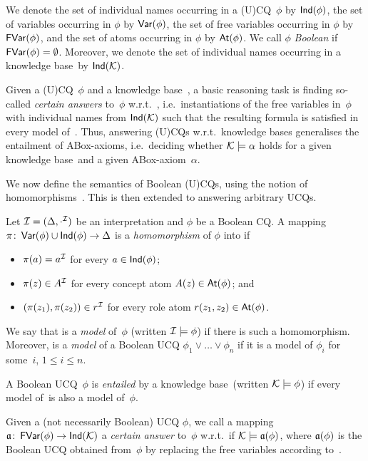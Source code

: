 \noindent
We denote the set of individual names occurring in a (U)CQ~$\phi$ by
$\mathsf{Ind}(\phi)$, the set of variables occurring in $\phi$ by $\operatorname{\mathsf{Var}}(\phi)$, the set
of free variables occurring in $\phi$ by $\operatorname{\mathsf{FVar}}(\phi)$, and the set of atoms
occurring in $\phi$ by $\operatorname{\mathsf{At}}(\phi)$.
%
We call $\phi$ \emph{Boolean} if $\operatorname{\mathsf{FVar}}(\phi)=\emptyset$.
%
Moreover, we denote the set of individual names occurring in a knowledge
base~\Kmc by $\mathsf{Ind}(\mathcal{K})$.

Given a (U)CQ~$\phi$ and a knowledge base~\Kmc, a basic reasoning task is
finding so-called \emph{certain answers} to~$\phi$ w.r.t.~\Kmc,
i.e.~instantiations of the free variables in~$\phi$ with individual names from
$\mathsf{Ind}(\mathcal{K})$ such that the resulting formula is satisfied in every model
of~\Kmc.  Thus, answering (U)CQs w.r.t.\ knowledge bases generalises the
entailment of ABox-axioms, i.e.~deciding whether $\mathcal{K}\models\alpha$ holds for a
given knowledge base~\Kmc and a given ABox-axiom~$\alpha$.

We now define the semantics of Boolean (U)CQs, using the notion of
homomorphisms~\cite{ChMe-STOC77}.  This is then extended to answering arbitrary
UCQs.

\begin{definition}
    Let $\mathcal{I}=(\Delta,\cdot^\mathcal{I})$ be an interpretation and $\phi$ be a Boolean
    CQ\@. A mapping $\pi\colon\operatorname{\mathsf{Var}}(\phi)\cup\mathsf{Ind}(\phi)\to\Delta$ is a
    \emph{homomorphism} of $\phi$ into \Imc if
    \begin{itemize}
        \item $\pi(a)=a^\mathcal{I}$ for every $a\in\mathsf{Ind}(\phi)$;
        \item $\pi(z)\in A^\mathcal{I}$ for every concept atom $A(z)\in\operatorname{\mathsf{At}}(\phi)$;
            and
        \item $(\pi(z_1),\pi(z_2))\in r^\mathcal{I}$ for every role atom
            $r(z_1,z_2)\in\operatorname{\mathsf{At}}(\phi)$.
    \end{itemize}
    We say that \Imc is a \emph{model} of~$\phi$ (written $\mathcal{I}\models\phi$) if
    there is such a homomorphism.  Moreover, \Imc is a \emph{model} of a Boolean
    UCQ $\phi_1\lor\dots\lor\phi_n$ if it is a model of $\phi_i$ for some~$i$,
    $1\le i\le n$.

    A Boolean UCQ~$\phi$ is \emph{entailed} by a knowledge base~\Kmc (written
    $\mathcal{K}\models\phi$) if every model of~\Kmc is also a model of~$\phi$.

    Given a (not necessarily Boolean) UCQ $\phi$, we call a mapping
    $\mathfrak{a}\colon\operatorname{\mathsf{FVar}}(\phi)\to\mathsf{Ind}(\mathcal{K})$ a \emph{certain answer} to~$\phi$
    w.r.t.~\Kmc if $\mathcal{K}\models\mathfrak{a}(\phi)$, where $\mathfrak{a}(\phi)$ is the Boolean
    UCQ obtained from~$\phi$ by replacing the free variables according to~\amf.
\end{definition}

